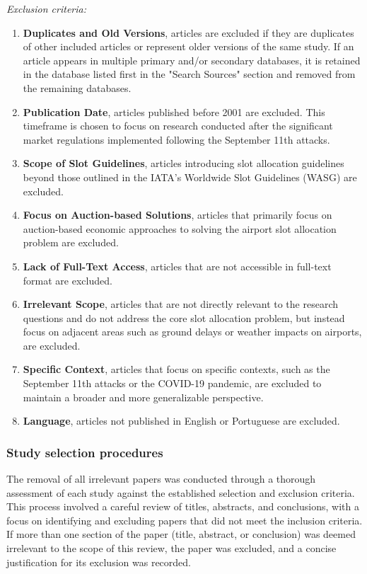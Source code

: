 \textit{Exclusion criteria:}
\begin{enumerate}
    \item \textbf{Duplicates and Old Versions}, articles are excluded if they are duplicates of other included articles or represent older versions of the same study. If an article appears in multiple primary and/or secondary databases, it is retained in the database listed first in the "Search Sources" section and removed from the remaining databases.
    \item \textbf{Publication Date}, articles published before 2001 are excluded. This timeframe is chosen to focus on research conducted after the significant market regulations implemented following the September 11th attacks.
    \item \textbf{Scope of Slot Guidelines}, articles introducing slot allocation guidelines beyond those outlined in the \acrshort{IATA}'s Worldwide Slot Guidelines (\acrshort{WASG}) \cite{WASG2020} are excluded.
    \item \textbf{Focus on Auction-based Solutions}, articles that primarily focus on auction-based economic approaches to solving the airport slot allocation problem are excluded.
    \item \textbf{Lack of Full-Text Access}, articles that are not accessible in full-text format are excluded.
    \item \textbf{Irrelevant Scope}, articles that are not directly relevant to the research questions and do not address the core slot allocation problem, but instead focus on adjacent areas such as ground delays or weather impacts on airports, are excluded.
    \item \textbf{Specific Context}, articles that focus on specific contexts, such as the September 11th attacks or the COVID-19 pandemic, are excluded to maintain a broader and more generalizable perspective.
    \item \textbf{Language}, articles not published in English or Portuguese are excluded.
\end{enumerate}

\subsubsection{Study selection procedures}

The removal of all irrelevant papers was conducted through a thorough assessment of each study against the established selection and exclusion criteria. This process involved a careful review of titles, abstracts, and conclusions, with a focus on identifying and excluding papers that did not meet the inclusion criteria. If more than one section of the paper (title, abstract, or conclusion) was deemed irrelevant to the scope of this review, the paper was excluded, and a concise justification for its exclusion was recorded.

